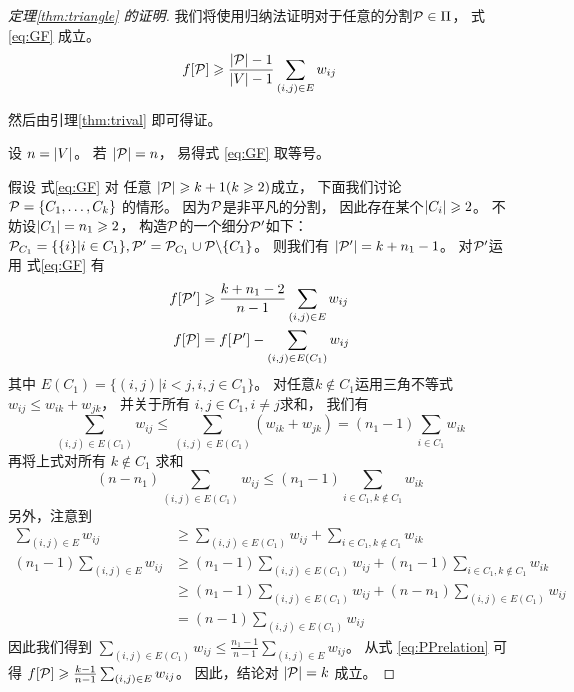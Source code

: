  \begin{proof}[定理\ref{thm:triangle} 的证明]
    我们将使用归纳法证明对于任意的分割$\P \in \Pi$，
    式\eqref{eq:GF} 成立。
    \begin{equation}\label{eq:GF}
    f[\P] \geq \frac{\abs{\P}-1}{\abs{V}-1} \sum_{(i,j) \in E} w_{ij}
    \end{equation}
    
    然后由引理\ref{thm:trival}
    即可得证。
    
    设 $n=\abs{V}$。
    若 $\abs{\P}=n$，
    易得式 \eqref{eq:GF} 取等号。
    
    假设 式\eqref{eq:GF} 对 任意
    $\abs{\P} \geq k+1(k\geq 2)$成立，
    下面我们讨论 $\P=\{C_1, \dots, C_k\}$
    的情形。
    因为$\P$是非平凡的分割，
    因此存在某个$\abs{C_i}\geq 2$。
    不妨设$\abs{C_1}=n_1\geq 2$，
    构造$\P$的一个细分$\P'$如下：
    $\P_{C_1} = \{\{i\}| i \in C_1\}, \P'=\P_{C_1} \cup \P \backslash \{C_1\}$。
    则我们有 $\abs{\P'} = k+n_1-1$。
    对$\P'$运用 式\eqref{eq:GF} 有
    \begin{align}\label{eq:PPrelation}
    f[\P'] &
    \geq \frac{k+n_1 -2}{n-1}\sum_{(i,j) \in E} w_{ij} \\
    f[\P] & =f[P'] - \sum_{(i,j) \in E(C_1)} w_{ij}
    \end{align}
    其中
    $E(C_1) =\{ (i,j) |i<j, i, j\in C_1 \}$。
    对任意$k \not\in C_1$运用三角不等式
    $w_{ij} \leq w_{ik} + w_{jk}$，
    并关于所有 $i, j \in C_1, i\neq j$求和，
    我们有
    $$
    \sum_{(i,j) \in E(C_1)} w_{ij} \leq \sum_{(i,j) \in E(C_1)} (w_{ik} + w_{jk}) = (n_1-1)\sum_{i\in C_1} w_{ik}
    $$
    再将上式对所有 $k \not\in C_1$ 求和
    $$
    (n - n_1) \sum_{(i,j) \in E(C_1)} w_{ij} \leq (n_1 - 1) \sum_{i \in C_1, k \not\in C_1} w_{ik}
    $$
    另外，注意到
    \begin{align*}
    \sum_{(i,j) \in E} w_{ij}  & \geq \sum_{(i,j) \in E(C_1)} w_{ij} + \sum_{i\in C_1, k\not\in C_1} w_{ik} \\
    (n_1 - 1)\sum_{(i,j) \in E} w_{ij}  & \geq (n_1 -1 )\sum_{(i,j) \in E(C_1)} w_{ij} + (n_1-1)\sum_{i\in C_1, k\not\in C_1} w_{ik} \\
    & \geq (n_1 -1 )\sum_{(i,j) \in E(C_1)} w_{ij} + (n - n_1) \sum_{(i,j) \in E(C_1)} w_{ij}\\
    & = (n-1) \sum_{(i,j) \in E(C_1)} w_{ij}
    \end{align*}
   因此我们得到 $\sum_{(i,j) \in E(C_1)} w_{ij} \leq \frac{n_1-1}{n-1}\sum_{(i,j) \in E} w_{ij}$。
   从式 \eqref{eq:PPrelation} 可得
    $f[\P] \geq \frac{k-1}{n-1}\sum_{(i,j) \in E} w_{ij}$。
    因此，结论对 $\abs{\P}=k$ 成立。
    \end{proof}
